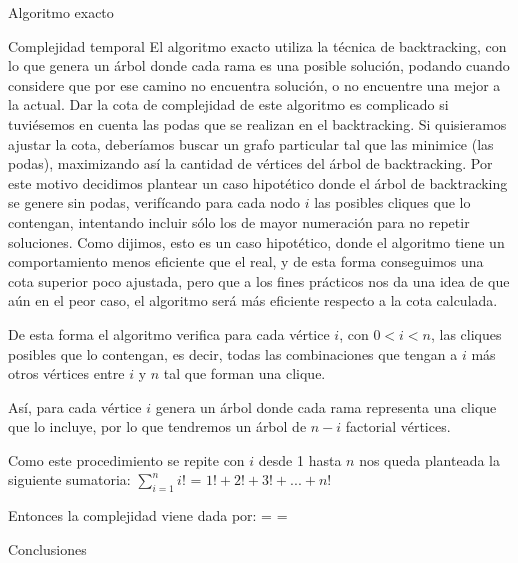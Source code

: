 \begin{section}{Algoritmo exacto}
\begin{subsection}{Complejidad temporal}
		El algoritmo exacto utiliza la técnica de backtracking, con lo que genera un árbol donde cada rama es una posible solución, podando cuando considere que por ese camino no encuentra solución, o no encuentre una mejor a la actual.
		Dar la cota de complejidad de este algoritmo es complicado si tuviésemos en cuenta las podas que se realizan en el backtracking. Si quisieramos ajustar la cota, deberíamos buscar un grafo particular tal que las minimice (las podas), maximizando así la cantidad de vértices del árbol de backtracking.
		Por este motivo decidimos plantear un caso hipotético donde el árbol de backtracking se genere sin podas, verifícando para cada nodo $i$ las posibles cliques que lo contengan, intentando incluir sólo los de mayor numeración para no repetir soluciones. Como dijimos, esto es un caso hipotético, donde el algoritmo tiene un comportamiento menos eficiente que el real, y de esta forma conseguimos una cota superior poco ajustada, pero que a los fines prácticos nos da una idea de que aún en el peor caso, el algoritmo será más eficiente respecto a la cota calculada. 

		De esta forma el algoritmo verifica para cada vértice $i$, con $0 < i < n$, las cliques posibles que lo contengan, es decir, todas las combinaciones que tengan a $i$ más otros vértices entre $i$ y $n$ tal que forman una clique.

		Así, para cada vértice $i$ genera un árbol donde cada rama representa una clique que lo incluye, por lo que tendremos un árbol de $n-i$ factorial vértices.

		Como este procedimiento se repite con $i$ desde 1 hasta $n$ nos queda planteada la siguiente sumatoria: $\sum_{i=1}^{n}{i!}$ = $1! + 2! + 3! + ... + n!$

		Entonces la complejidad viene dada por: = = 
		
		
		\end{subsection}
		\begin{subsection}{Conclusiones}
		
		\end{subsection}
\end{section}

